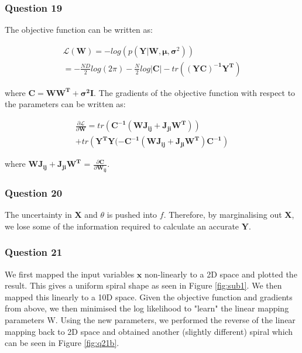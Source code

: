 \documentclass[10pt, a4paper, twocolumn]{article} %
\begin{document}
\subsubsection*{Question 19}

The objective function can be written as:

\begin{multline}
  \mathcal{L}(\mathbf{W}) = -log(p(\mathbf{Y}|\mathbf{W}, \bm{\mu}, \bm{\sigma}^2)) \\
  = -\frac{ND}{2}log(2\pi) - \frac{N}{2}log|\mathbf{C}| - tr(\mathbf{(YC)^{-1}Y^T})
\end{multline}

where $\mathbf{C} = \mathbf{WW^T} + \bm{\sigma^2}\mathbf{I}$. The gradients of the objective function with respect to the parameters can be written as:

\begin{multline}
  \frac{\partial \mathcal{L}}{\partial \mathbf{W}} = tr(\mathbf{C^{-1}(WJ_{ij} +  J_{ji}W^T)}) \\
  + tr(\mathbf{Y^TY(-C^{-1}(WJ_{ij} +  J_{ji}W^T)C^{-1}})
\end{multline}

where $\mathbf{WJ_{ij} +  J_{ji}W^T}$ = $\frac{\partial \mathbf{C}}{\partial \mathbf{W_{ij}}}$.

\subsubsection*{Question 20}
The uncertainty in $\mathbf{X}$ and $\theta$ is pushed into $f$. Therefore, by marginalising out $\mathbf{X}$, we lose some of the information required to calculate an accurate $\mathbf{Y}$.

\subsubsection*{Question 21}

We first mapped the input variables $\mathbf{x}$ non-linearly to a 2D space and plotted the result. This gives a uniform spiral shape as seen in Figure \ref{fig:sub1}. We then mapped this linearly to a 10D space. Given the objective function and gradients from above, we then minimised the log likelihood to "learn" the linear mapping parameters W. Using the new parameters, we performed the reverse of the linear mapping back to 2D space and obtained another (slightly different) spiral which can be seen in Figure \ref{fig:q21b}.
\end{document}
